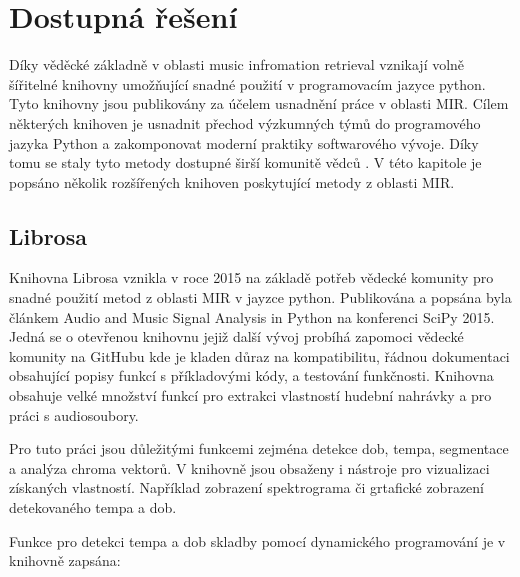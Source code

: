 






\section{Dostupná řešení} \label{sec:Dostupna_reseni}
    Díky věděcké základně v oblasti music infromation retrieval vznikají volně šířitelné knihovny umožňující snadné použití v programovacím jazyce python. Tyto knihovny jsou publikovány za účelem usnadnění práce v oblasti \acs{MIR}. Cílem některých knihoven je usnadnit přechod výzkumných týmů do programového jazyka Python a zakomponovat moderní praktiky softwarového vývoje. Díky tomu se staly tyto metody dostupné širší komunitě vědců \cite{Librosa}. V této kapitole je popsáno několik rozšířených knihoven poskytující metody z oblasti \acs{MIR}.

\subsection{Librosa} \label{sec:Librosa}
    Knihovna Librosa vznikla v roce 2015 na základě potřeb vědecké komunity pro snadné použití metod z oblasti \acs{MIR} v jayzce python.
    Publikována a popsána byla článkem Audio and Music Signal Analysis in Python \cite{Librosa} na konferenci SciPy 2015.
    Jedná se o otevřenou knihovnu jejiž další vývoj probíhá zapomoci vědecké komunity na GitHubu kde je kladen důraz na kompatibilitu, řádnou dokumentaci obsahující popisy funkcí s příkladovými kódy, a testování funkčnosti. Knihovna obsahuje velké množství funkcí pro extrakci vlastností hudební nahrávky a pro práci s audiosoubory.

    Pro tuto práci jsou důležitými funkcemi zejména detekce dob, tempa, segmentace a analýza chroma vektorů. V knihovně jsou obsaženy i nástroje pro vizualizaci získaných vlastností. Například zobrazení spektrograma či grtafické zobrazení detekovaného tempa a dob.

    Funkce pro detekci tempa a dob skladby pomocí dynamického programování je v knihovně zapsána:

